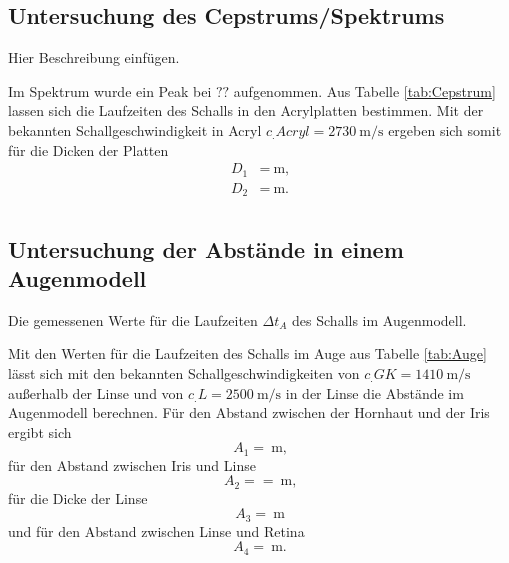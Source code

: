 \subsection{Untersuchung des Cepstrums/Spektrums}

\begin{table}
	\centering
	\caption{Hier Beschreibung einfügen.}
	\label{tab:Cepstrum}
\end{table}

\noindent Im Spektrum wurde ein Peak bei $??$ aufgenommen.
Aus Tabelle \ref{tab:Cepstrum} lassen sich die Laufzeiten des Schalls in den Acrylplatten bestimmen.
Mit der bekannten Schallgeschwindigkeit in Acryl $c_.{Acryl}=\SI{2730}{\meter\per\second}$ \cite{cAcryl} ergeben sich somit für die Dicken der Platten
\begin{align*}
D_1&=\SI{}{\meter}\text{,}\\
D_2&=\SI{}{\meter}\text{.}\\
\end{align*}

\subsection{Untersuchung der Abstände in einem Augenmodell}

\begin{table}
	\centering
	\caption{Die gemessenen Werte für die Laufzeiten $\Delta t_A$ des Schalls im Augenmodell.}
	
	\label{tab:Auge}
\end{table}

\noindent Mit den Werten für die Laufzeiten des Schalls im Auge aus Tabelle \ref{tab:Auge} lässt sich mit den bekannten Schallgeschwindigkeiten von $c_.{GK}=\SI{1410}{\meter\per\second}$ außerhalb der Linse und von $c_.{L}=\SI{2500}{\meter\per\second}$ in der Linse die Abstände im Augenmodell berechnen. Für den Abstand zwischen der Hornhaut und der Iris ergibt sich
\begin{equation*}
A_1=\SI{}{\meter}\text{,}
\end{equation*}
für den Abstand zwischen Iris und Linse
\begin{equation*}
A_2==\SI{}{\meter}\text{,}
\end{equation*}
für die Dicke der Linse
\begin{equation*}
A_3=\SI{}{\meter}
\end{equation*}
und für den Abstand zwischen Linse und Retina 
\begin{equation*}
A_4=\SI{}{\meter}\text{.}
\end{equation*}
